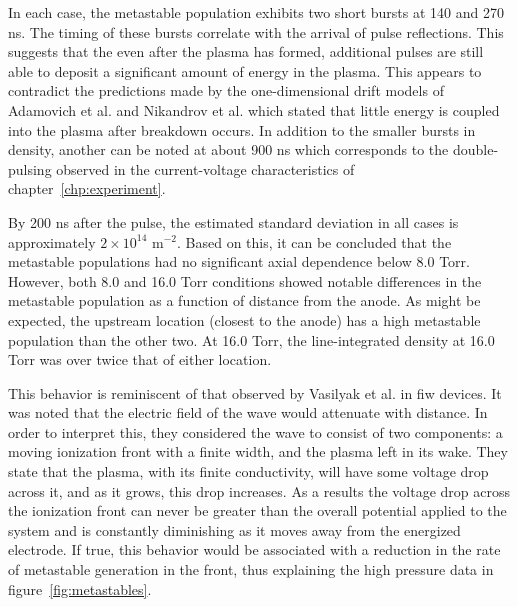 In each case, the metastable population exhibits two short bursts at 140 and 270
ns. The timing of these bursts correlate with the arrival of pulse reflections.
This suggests that the even after the plasma has formed, additional pulses are
still able to deposit a significant amount of energy in the plasma. This appears
to contradict the predictions made by the one-dimensional drift models of
Adamovich et al. \cite{Adamovich2009} and Nikandrov et al. \cite{Nikandrov2008}
which stated that little energy is coupled into the plasma after breakdown
occurs. In addition to the smaller bursts in density, another can be noted at
about 900 ns which corresponds to the double-pulsing observed in the
current-voltage characteristics of chapter~\ref{chp:experiment}.

By 200 ns after the pulse, the estimated standard deviation in all cases is
approximately $2\times10^{14}$ m$^{-2}$. Based on this, it can be concluded that
the metastable populations had no significant axial dependence below 8.0 Torr.
However, both 8.0 and 16.0 Torr conditions showed notable differences in the
metastable population as a function of distance from the anode. As might be
expected, the upstream location (closest to the anode) has a high metastable
population than the other two. At 16.0 Torr, the line-integrated density at 16.0
Torr was over twice that of either location.

This behavior is reminiscent of that observed by Vasilyak et al.
\cite{Vasilyak1994} in \acs{fiw} devices. It was noted that the electric field
of the wave would attenuate with distance. In order to interpret this, they
considered the wave to consist of two components: a moving ionization front with
a finite width, and the plasma left in its wake. They state that the plasma,
with its finite conductivity, will have some voltage drop across it, and as it
grows, this drop increases. As a results the voltage drop across the ionization
front can never be greater than the overall potential applied to the system and
is constantly diminishing as it moves away from the energized electrode. If
true, this behavior would be associated with a reduction in the rate of
metastable generation in the front, thus explaining the high pressure data in
figure~\ref{fig:metastables}.

